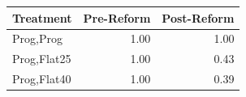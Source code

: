 \begin{tabular}{lrr}
\toprule
Treatment & Pre-Reform & Post-Reform \\
\midrule
Prog,Prog & 1.00 & 1.00 \\
Prog,Flat25 & 1.00 & 0.43 \\
Prog,Flat40 & 1.00 & 0.39 \\
\bottomrule
\end{tabular}
